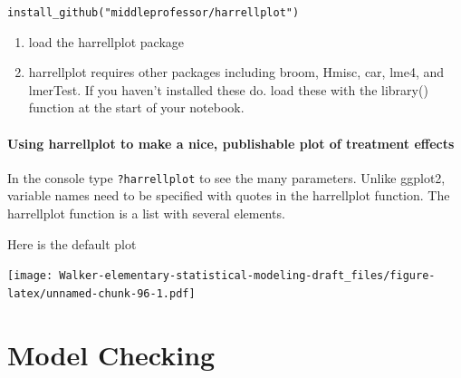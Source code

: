 \documentclass[]{book}
\newenvironment{Shaded}{\begin{snugshade}}{\end{snugshade}}
\newcommand{\CommentTok}[1]{\textcolor[rgb]{0.56,0.35,0.01}{\textit{#1}}}
\newcommand{\DataTypeTok}[1]{\textcolor[rgb]{0.13,0.29,0.53}{#1}}
\newcommand{\KeywordTok}[1]{\textcolor[rgb]{0.13,0.29,0.53}{\textbf{#1}}}
\newcommand{\NormalTok}[1]{#1}
\newcommand{\OperatorTok}[1]{\textcolor[rgb]{0.81,0.36,0.00}{\textbf{#1}}}
\newcommand{\StringTok}[1]{\textcolor[rgb]{0.31,0.60,0.02}{#1}}
\providecommand{\tightlist}{%
  \setlength{\itemsep}{0pt}\setlength{\parskip}{0pt}}
\begin{document}
\texttt{install\_github("middleprofessor/harrellplot")}

\begin{enumerate}
\def\labelenumi{\arabic{enumi}.}
\setcounter{enumi}{2}
\tightlist
\item
  load the harrellplot package
\item
  harrellplot requires other packages including broom, Hmisc, car, lme4, and lmerTest. If you haven't installed these do. load these with the library() function at the start of your notebook.
\end{enumerate}

\hypertarget{using-harrellplot-to-make-a-nice-publishable-plot-of-treatment-effects}{%
\subsubsection{Using harrellplot to make a nice, publishable plot of treatment effects}\label{using-harrellplot-to-make-a-nice-publishable-plot-of-treatment-effects}}

In the console type \texttt{?harrellplot} to see the many parameters. Unlike ggplot2, variable names need to be specified with quotes in the harrellplot function. The harrellplot function is a list with several elements.

Here is the default plot

\begin{Shaded}
\end{Shaded}

\texttt{[image: Walker-elementary-statistical-modeling-draft\_files/figure-latex/unnamed-chunk-96-1.pdf]}

\hypertarget{model-checking}{%
\chapter{Model Checking}\label{model-checking}}
\end{document}
